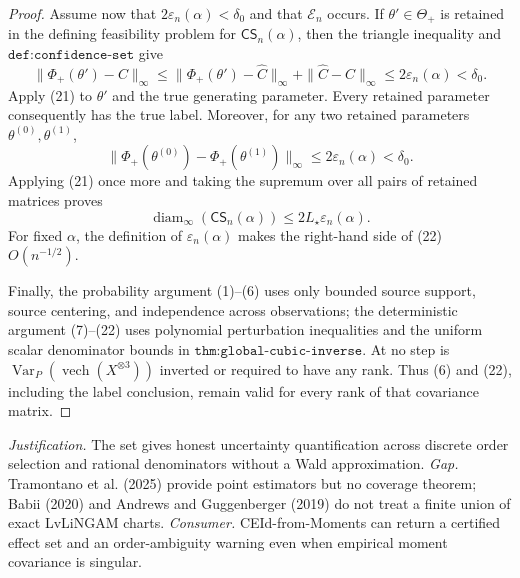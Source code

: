 \documentclass{article}
\begin{document}
\begin{proof}
Assume now that \(2\varepsilon_n(\alpha)<\delta_0\) and that \(\mathcal E_n\) occurs.  If \(\theta'\in\Theta_+\) is retained in the defining feasibility problem for \(\mathsf{CS}_n(\alpha)\), then the triangle inequality and \(\texttt{def:confidence-set}\) give
\[
 \|\Phi_+(\theta')-C\|_\infty
 \leq
 \|\Phi_+(\theta')-\widehat C\|_\infty
 +\|\widehat C-C\|_\infty
 \leq2\varepsilon_n(\alpha)<\delta_0.
\]
Apply (21) to \(\theta'\) and the true generating parameter.  Every retained parameter consequently has the true label.  Moreover, for any two retained parameters \(\theta^{(0)},\theta^{(1)}\),
\[
 \|\Phi_+(\theta^{(0)})-\Phi_+(\theta^{(1)})\|_\infty
 \leq2\varepsilon_n(\alpha)<\delta_0.
\]
Applying (21) once more and taking the supremum over all pairs of retained matrices proves
\[
 \operatorname{diam}_\infty(\mathsf{CS}_n(\alpha))
 \leq2L_\star\varepsilon_n(\alpha).                               \tag{22}
\]
For fixed \(\alpha\), the definition of \(\varepsilon_n(\alpha)\) makes the right-hand side of (22) \(O(n^{-1/2})\).

Finally, the probability argument (1)--(6) uses only bounded source support, source centering, and independence across observations; the deterministic argument (7)--(22) uses polynomial perturbation inequalities and the uniform scalar denominator bounds in \(\texttt{thm:global-cubic-inverse}\).  At no step is \(\operatorname{Var}_P(\operatorname{vech}(X^{\otimes3}))\) inverted or required to have any rank.  Thus (6) and (22), including the label conclusion, remain valid for every rank of that covariance matrix.
\end{proof}
\par\smallskip\noindent \textit{Justification.} The set gives honest uncertainty quantification across discrete order selection and rational denominators without a Wald approximation. \textit{Gap.} Tramontano et al. (2025) provide point estimators but no coverage theorem; Babii (2020) and Andrews and Guggenberger (2019) do not treat a finite union of exact LvLiNGAM charts. \textit{Consumer.} CEId-from-Moments can return a certified effect set and an order-ambiguity warning even when empirical moment covariance is singular.
\end{document}
